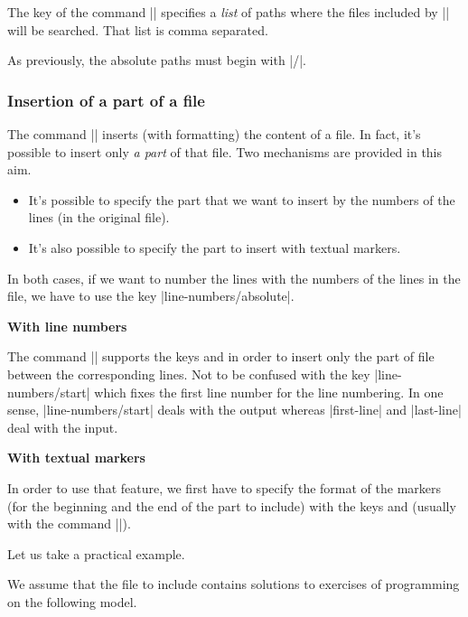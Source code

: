 \documentclass{article}
\begin{document}
The key  of the command |\PitonOptions| specifies a
\emph{list} of paths where the files included by |\PitonInputFile| will be
searched. That list is comma separated.

As previously, the absolute paths must begin with |/|.

\bigskip
\subsubsection{Insertion of a part of a file}

\label{part-of-a-file}

The command |\PitonInputFile| inserts (with formatting) the content of a file.
In fact, it's possible to insert only \emph{a part} of that file. Two
mechanisms are provided in this aim.
\begin{itemize}
\item It's possible to specify the part that we want to insert by the numbers
of the lines (in the original file).
\item It's also possible to specify the part to insert with textual markers.
\end{itemize}
In both cases, if we want to number the lines with the numbers of the
lines in the file, we have to use the key |line-numbers/absolute|.

\bigskip
\textbf{With line numbers}

\nobreak
The command |\PitonInputFile| supports the keys  and
 in order to insert only the part of file between the
corresponding lines. Not to be confused with the key |line-numbers/start|
which fixes the first line number for the line numbering. In one sense,
|line-numbers/start| deals with the output whereas |first-line| and
|last-line| deal with the input.

\bigskip
\textbf{With textual markers}

\nobreak
{}

In order to use that feature, we first have to specify the format of the
markers (for the beginning and the end of the part to include) with the keys
 and  (usually with the
command |\PitonOptions|). 


\medskip
Let us take a practical example.

\medskip
We assume that the file to include contains solutions to exercises of
programming on the following model.
\end{document}
